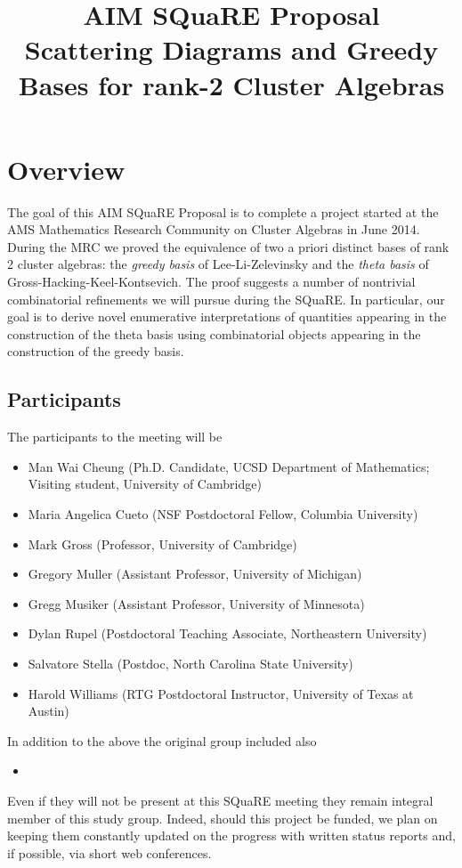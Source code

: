 \documentclass{amsart}
\title[\small{Scattering Diagrams and Greedy Bases for rank-2 Cluster Algebras}]
  {AIM SQuaRE Proposal\\ 
  \small{Scattering Diagrams and Greedy Bases for rank-2 Cluster Algebras}}
\begin{document}
  \maketitle
  
  \section*{Overview}
    The goal of this AIM SQuaRE Proposal is to complete a project started at the
    AMS Mathematics Research Community on Cluster Algebras in June 2014.
    During the MRC we proved the equivalence of two a priori distinct bases of
    rank 2 cluster algebras: the \emph{greedy basis} of Lee-Li-Zelevinsky and
    the \emph{theta basis} of Gross-Hacking-Keel-Kontsevich.
    The proof suggests a number of nontrivial combinatorial refinements we will
    pursue during the SQuaRE.
    In particular, our goal is to derive novel enumerative interpretations of
    quantities appearing in the construction of the theta basis using
    combinatorial objects appearing in the construction of the greedy basis.

  \subsection*{Participants}
    The participants to the meeting will be 
    \begin{itemize}
      \item Man Wai Cheung (Ph.D. Candidate, UCSD Department of Mathematics;
          Visiting student, University of Cambridge)
      \item Maria Angelica Cueto (NSF Postdoctoral Fellow, Columbia University)
      \item Mark Gross (Professor, University of Cambridge)
      \item Gregory Muller (Assistant Professor, University of Michigan)
      \item Gregg Musiker (Assistant Professor, University of Minnesota)
      \item Dylan Rupel (Postdoctoral Teaching Associate, Northeastern
          University)
      \item Salvatore Stella (Postdoc, North Carolina State University)
      \item Harold Williams (RTG Postdoctoral Instructor, University of 
          Texas at Austin) 
    \end{itemize}
    In addition to the above the original group included also
    \begin{itemize}
      \item
    \end{itemize}
    Even if they will not be present at this SQuaRE meeting they remain integral
    member of this study group. 
    Indeed, should this project be funded, we plan on keeping them constantly
    updated on the progress with written  status reports and, if possible, via
    short web conferences.
  
\end{document}
